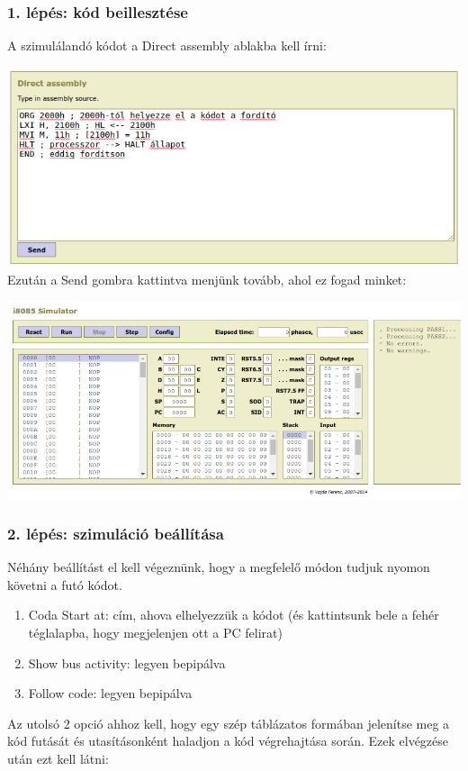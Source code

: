 \documentclass{article}
\begin{document}
\subsubsection{1. lépés: kód beillesztése}
A szimulálandó kódot a Direct assembly ablakba kell írni:

\includegraphics[scale=0.5]{sim_lepes1.png} \\
Ezután a Send gombra kattintva menjünk tovább, ahol ez fogad minket:

\includegraphics[scale=0.4]{sim_lepes2.png}

\subsubsection{2. lépés: szimuláció beállítása}

Néhány beállítást el kell végeznünk, hogy a megfelelő módon tudjuk nyomon követni a futó kódot.
\begin{enumerate}
	\item Coda Start at: cím, ahova elhelyezzük a kódot (és kattintsunk bele a fehér téglalapba, hogy megjelenjen ott a PC felirat)
	\item Show bus activity: legyen bepipálva
	\item Follow code: legyen bepipálva
\end{enumerate}
Az utolsó 2 opció ahhoz kell, hogy egy szép táblázatos formában jelenítse meg a kód futását és utasításonként haladjon a kód végrehajtása során.
Ezek elvégzése után ezt kell látni:
\end{document}
